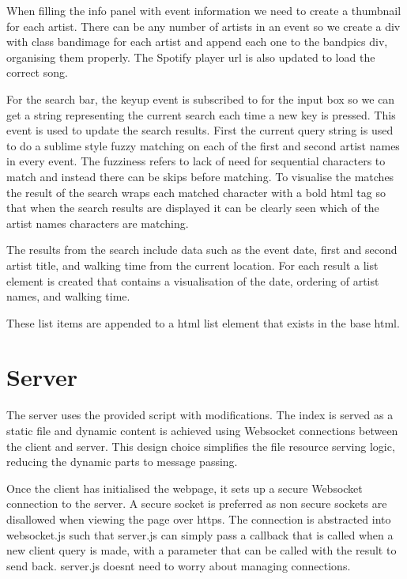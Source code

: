 \documentclass[10pt]{article}
\begin{document}
            When filling the info panel with event information we need to create a thumbnail for each artist. There can be any number of artists in an event so we create a div with class bandimage for each artist and append each one to the bandpics div, organising them properly. The Spotify player url is also updated to load the correct song.

            For the search bar, the keyup event is subscribed to for the input box so we can get a string representing the current search each time a new key is pressed. This event is used to update the search results. First the current query string is used to do a sublime style fuzzy matching on each of the first and second artist names in every event. The fuzziness refers to lack of need for sequential characters to match and instead there can be skips before matching. To visualise the matches the result of the search wraps each matched character with a bold html tag so that when the search results are displayed it can be clearly seen which of the artist names characters are matching.

            The results from the search include data such as the event date, first and second artist title, and walking time from the current location. For each result a list element is created that contains a visualisation of the date, ordering of artist names, and walking time.

            These list items are appended to a html list element that exists in the base html.

    \section{Server}
        The server uses the provided script with modifications. The index is served as a static file and dynamic content is achieved using Websocket connections between the client and server. This design choice simplifies the file resource serving logic, reducing the dynamic parts to message passing.

        Once the client has initialised the webpage, it sets up a secure Websocket connection to the server. A secure socket is preferred as non secure sockets are disallowed when viewing the page over https. The connection is abstracted into websocket.js such that server.js can simply pass a callback that is called when a new client query is made, with a parameter that can be called with the result to send back. server.js doesnt need to worry about managing connections.
\end{document}
